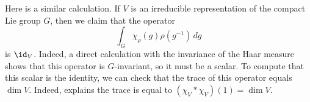\documentclass[notes.tex]{subfiles}
\begin{document}
\begin{example} \label{ex:char-avg-proj}
	Here is a similar calculation. If $V$ is an irreducible representation of the compact Lie group $G$, then we claim that the operator
	\[\int_G\chi_\rho(g)\rho\left(g^{-1}\right)\,dg\]
	is $\id_V$. Indeed, a direct calculation with the invariance of the Haar measure shows that this operator is $G$-invariant, so it must be a scalar. To compute that this scalar is the identity, we can check that the trace of this operator equals $\dim V$. Indeed,  explains the trace is equal to $(\chi_V*\chi_V)(1)=\dim V$.
\end{example}

	
\end{document}
